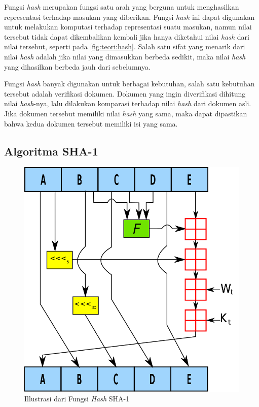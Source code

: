 \documentclass[conference]{IEEEtran}
\newcommand{\en}[1]
    {\foreignlanguage{english}{\textit{#1}}}
\begin{document}
Fungsi \en{hash} merupakan fungsi satu arah yang berguna untuk menghasilkan representasi terhadap masukan yang diberikan. \cite{coron2005merkle}
Fungsi \en{hash} ini dapat digunakan untuk melakukan komputasi terhadap representasi suatu masukan, namun nilai tersebut tidak dapat dikembalikan kembali jika hanya diketahui nilai \en{hash} dari nilai tersebut, seperti pada \autoref{fig:teori:hash}.
Salah satu sifat yang menarik dari nilai \en{hash} adalah jika nilai yang dimasukkan berbeda sedikit, maka nilai \en{hash} yang dihasilkan berbeda jauh dari sebelumnya.

Fungsi \en{hash} banyak digunakan untuk berbagai kebutuhan, salah satu kebutuhan tersebut adalah verifikasi dokumen.
Dokumen yang ingin diverifikasi dihitung nilai \en{hash}-nya, lalu dilakukan komparasi terhadap nilai \en{hash} dari dokumen asli.
Jika dokumen tersebut memiliki nilai \en{hash} yang sama, maka dapat dipastikan bahwa kedua dokumen tersebut memiliki isi yang sama.

\subsection{Algoritma SHA-1}

\begin{figure}[htbp]
    \includegraphics[width=\linewidth]{img/teori-sha1-graph.png}
    \caption{Illustrasi dari Fungsi \en{Hash} SHA-1}
    \label{fig:teori:sha1}
\end{figure}
\end{document}
